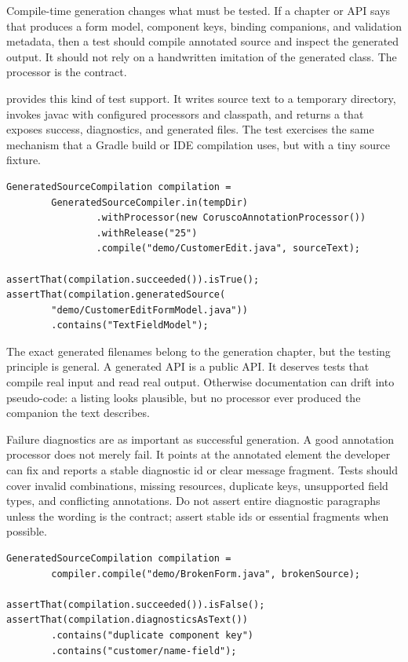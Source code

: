 Compile-time generation changes what must be tested. If a chapter or API says that  produces a form model, component keys, binding companions, and validation metadata, then a test should compile annotated source and inspect the generated output. It should not rely on a handwritten imitation of the generated class. The processor is the contract.

 provides this kind of test support. It writes source text to a temporary directory, invokes javac with configured processors and classpath, and returns a  that exposes success, diagnostics, and generated files. The test exercises the same mechanism that a Gradle build or IDE compilation uses, but with a tiny source fixture.

\begin{lstlisting}[caption={Compiling annotated source in a focused generation test.}]
GeneratedSourceCompilation compilation =
        GeneratedSourceCompiler.in(tempDir)
                .withProcessor(new CoruscoAnnotationProcessor())
                .withRelease("25")
                .compile("demo/CustomerEdit.java", sourceText);

assertThat(compilation.succeeded()).isTrue();
assertThat(compilation.generatedSource(
        "demo/CustomerEditFormModel.java"))
        .contains("TextFieldModel");
\end{lstlisting}

The exact generated filenames belong to the generation chapter, but the testing principle is general. A generated API is a public API. It deserves tests that compile real input and read real output. Otherwise documentation can drift into pseudo-code: a listing looks plausible, but no processor ever produced the companion the text describes.

Failure diagnostics are as important as successful generation. A good annotation processor does not merely fail. It points at the annotated element the developer can fix and reports a stable diagnostic id or clear message fragment. Tests should cover invalid combinations, missing resources, duplicate keys, unsupported field types, and conflicting annotations. Do not assert entire diagnostic paragraphs unless the wording is the contract; assert stable ids or essential fragments when possible.

\begin{lstlisting}[caption={Testing a processor diagnostic without freezing all wording.}]
GeneratedSourceCompilation compilation =
        compiler.compile("demo/BrokenForm.java", brokenSource);

assertThat(compilation.succeeded()).isFalse();
assertThat(compilation.diagnosticsAsText())
        .contains("duplicate component key")
        .contains("customer/name-field");
\end{lstlisting}

